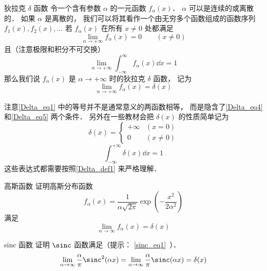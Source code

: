 \begin{definition}{狄拉克 $\delta$ 函数}\label{Delta_def1}
令一个含有参数 $\alpha$ 的一元函数 $f_\alpha(x)$． $\alpha$ 可以是连续的或离散的． 如果 $\alpha$ 是离散的， 我们可以将其看作一个由无穷多个函数组成的函数序列 $f_1(x), f_2(x), \dots$ 若 $f_\alpha(x)$ 在所有 $x \ne 0$ 处都满足
\begin{equation}\label{Delta_eq4}
\lim_{\alpha\to+\infty} f_\alpha(x) = 0 \qquad (x \ne 0)
\end{equation}
且（注意极限和积分不可交换）
\begin{equation}\label{Delta_eq5}
\lim_{\alpha\to+\infty} \int_{-\infty}^{\infty} f_\alpha(x) \dd{x} = 1
\end{equation}
那么我们说 $f_\alpha(x)$ 是 $\alpha\to+\infty$ 时的狄拉克 $\delta$ 函数， 记为
\begin{equation}\label{Delta_eq1}
\lim_{\alpha\to+\infty} f_\alpha(x) = \delta(x)
\end{equation}
\end{definition}
注意\autoref{Delta_eq1} 中的等号并不是通常意义的两函数相等， 而是隐含了\autoref{Delta_eq4} 和\autoref{Delta_eq5} 两个条件． 另外在一些教材会把 $\delta(x)$ 的性质简单记为
\begin{equation}\label{Delta_eq2}
\delta(x) =
\begin{cases}
+\infty & (x = 0)\\
0 & (x \ne 0)
\end{cases}
\end{equation}
\begin{equation}\label{Delta_eq3}
\int_{-\infty}^{+\infty} \delta(x) \dd{x} = 1
\end{equation}
这些表达式都需要按照\autoref{Delta_def1} 来严格理解．

\begin{exercise}{高斯函数}
证明高斯分布函数
\begin{equation}
f_\alpha(x) = \frac{1}{\alpha \sqrt{2\pi }} \exp(-\frac{x^2}{2\alpha ^2})
\end{equation}
满足
\begin{equation}
\lim_{\alpha\to\infty}f_\alpha(x) = \delta(x)
\end{equation}
\end{exercise}
\begin{exercise}{sinc 函数}\label{Delta_exe1}
证明 $\sinc$ 函数满足（提示： \autoref{sinc_eq1}~）．
\begin{equation}
\lim_{\alpha\to\infty}\frac{\alpha}{\pi}\sinc^2(\alpha x) = \lim_{\alpha\to\infty}\frac{\alpha}{\pi}\sinc(\alpha x) = \delta(x)
\end{equation}
\end{exercise}

